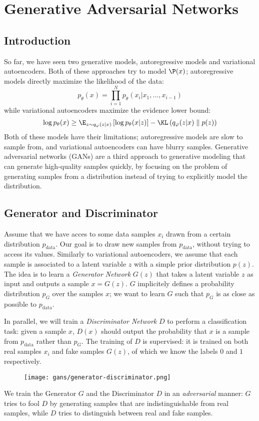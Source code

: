 \section{Generative Adversarial Networks}
\subsection{Introduction}
So far, we have seen two generative models, autoregressive models and variational autoencoders. Both of these approaches try to model $\P(x)$; autoregressive models directly maximize the likelihood of the data:
\begin{equation*}
    p_\theta(x) = \prod_{i=1}^N p_\theta(x_i|x_1, \dots, x_{i-1})
\end{equation*}
while variational autoencoders maximize the evidence lower bound:
\begin{equation*}
    \log p_\theta(x) \geq \E_{z\sim q_\varphi(z|x)}\left[\log p_\theta(x|z)\right] - \KL\left(q_\varphi(z|x)\;\middle\|\; p(z)\right)
\end{equation*}
Both of these models have their limitations; autoregressive models are slow to sample from, and variational autoencoders can have blurry samples. Generative adversarial networks (GANs) are a third approach to generative modeling that can generate high-quality samples quickly, by focusing on the problem of generating samples from a distribution instead of trying to explicitly model the distribution.

\subsection{Generator and Discriminator}
Assume that we have acces to some data samples $x_i$ drawn from a certain distribution $p_{\text{data}}$. Our goal is to draw new samples from $p_{\text{data}}$, without trying to access its values. Similarly to variational autoencoders, we assume that each sample is associated to a latent variable $z$ with a simple prior distribution $p(z)$. The idea is to learn a \emph{Generator Network} $G(z)$ that takes a latent variable $z$ as input and outputs a sample $x = G(z)$. $G$ implicitely defines a probability distribution $p_G$ over the samples $x$; we want to learn $G$ such that $p_G$ is as close as possible to $p_{\text{data}}$.

In parallel, we will train a \emph{Discriminator Network} $D$ to perform a classification task: given a sample $x$, $D(x)$ should output the probability that $x$ is a sample from $p_{\text{data}}$ rather than $p_G$. The training of $D$ is supervised: it is trained on both real samples $x_i$ and fake samples $G(z)$, of which we know the labels $0$ and $1$ respectively.
\begin{figure}[H]
    \centering
    \texttt{[image: gans/generator-discriminator.png]}
\end{figure}
We train the Generator $G$ and the Discriminator $D$ in an \emph{adversarial} manner: $G$ tries to fool $D$ by generating samples that are indistinguishable from real samples, while $D$ tries to distinguish between real and fake samples.

